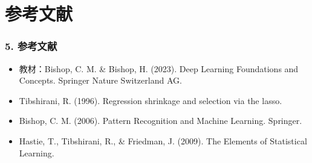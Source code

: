 \documentclass[t,aspectratio=169]{beamer} %
\begin{document}
\section{参考文献}

\begin{frame}
    \frametitle{5. 参考文献}
    \begin{itemize}
        \item 教材：Bishop, C. M. \& Bishop, H. (2023). Deep Learning Foundations and Concepts. Springer Nature Switzerland AG.
        \item Tibshirani, R. (1996). Regression shrinkage and selection via the lasso.
        \item Bishop, C. M. (2006). Pattern Recognition and Machine Learning. Springer.
        \item Hastie, T., Tibshirani, R., \& Friedman, J. (2009). The Elements of Statistical Learning.
    \end{itemize}
\end{frame}
\end{document}
